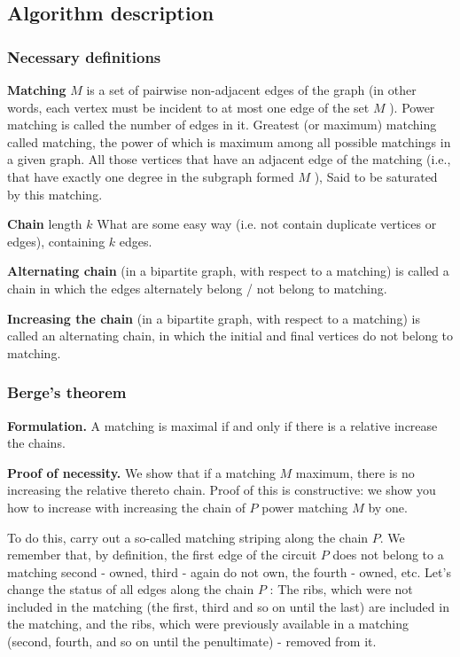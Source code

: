 \subsection{ Algorithm description }

\subsubsection{ Necessary definitions }

\textbf{Matching} $M$ is a set of pairwise non-adjacent edges of the graph (in other words, each vertex must be incident to at most one edge of the set $M$ ). Power matching is called the number of edges in it. Greatest (or maximum) matching called matching, the power of which is maximum among all possible matchings in a given graph. All those vertices that have an adjacent edge of the matching (i.e., that have exactly one degree in the subgraph formed $M$ ), Said to be saturated by this matching.

\textbf{Chain} length $k$ What are some easy way (i.e. not contain duplicate vertices or edges), containing $k$ edges.

\textbf{Alternating chain} (in a bipartite graph, with respect to a matching) is called a chain in which the edges alternately belong / not belong to matching.

\textbf{Increasing the chain} (in a bipartite graph, with respect to a matching) is called an alternating chain, in which the initial and final vertices do not belong to matching.

\subsubsection{ Berge's theorem }

\textbf{Formulation.} A matching is maximal if and only if there is a relative increase the chains.

\textbf{Proof of necessity.} We show that if a matching $M$ maximum, there is no increasing the relative thereto chain. Proof of this is constructive: we show you how to increase with increasing the chain of $P$ power matching $M$ by one.

To do this, carry out a so-called matching striping along the chain $P$. We remember that, by definition, the first edge of the circuit $P$ does not belong to a matching second - owned, third - again do not own, the fourth - owned, etc. Let's change the status of all edges along the chain $P$ : The ribs, which were not included in the matching (the first, third and so on until the last) are included in the matching, and the ribs, which were previously available in a matching (second, fourth, and so on until the penultimate) - removed from it.

